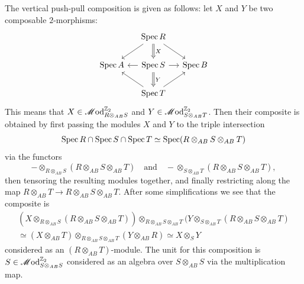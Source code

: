 The vertical push-pull composition is given as follows: let $X$ and $Y$ be two composable $2$-morphisms:
\begin{equation*}
	\begin{tikzcd}[column sep = small]
		& \Spec R \ar[d, "X", Rightarrow] \ar[dl] \ar[dr] & \\
		\Spec A & \Spec S \ar[d, "Y", Rightarrow] \ar[l] \ar[r] & \Spec B \\
		& \Spec T \ar[ul] \ar[ur] &
	\end{tikzcd}
\end{equation*}
This means that $X \in \mathscr{M}\mathrm{od}^{\mathbb{Z}_2}_{R \otimes_{AB} S}$ and $Y \in \mathscr{M}\mathrm{od}^{\mathbb{Z}_2}_{S \otimes_{AB} T}$. Then their composite is obtained by first passing the modules $X$ and $Y$ to the triple intersection
\begin{equation*}
	\operatorname{Spec} R \cap \operatorname{Spec} S \cap \operatorname{Spec} T \simeq \operatorname{Spec} (R \otimes_{AB} S \otimes_{AB} T)
\end{equation*}
via the functors
\begin{equation*}
	- \otimes_{R \otimes_{AB} S} (R \otimes_{AB} S \otimes_{AB} T) \quad \text{and} \quad - \otimes_{S \otimes_{AB} T} (R \otimes_{AB} S \otimes_{AB} T),
\end{equation*}
then tensoring the resulting modules together, and finally restricting along the map $R \otimes_{AB} T \to R \otimes_{AB} S \otimes_{AB} T$. After some simplifications we see that the composite is
\begin{multline*}
	(X \otimes_{R \otimes_{AB} S} (R \otimes_{AB} S \otimes_{AB} T)) \otimes_{R \otimes_{AB} S \otimes_{AB} T} (Y \otimes_{S \otimes_{AB} T} (R \otimes_{AB} S \otimes_{AB} T) \\
	\simeq (X \otimes_{{AB}} T) \otimes_{R \otimes_{AB} S \otimes_{AB} T} (Y \otimes_{AB} R) \simeq X \otimes_S Y
\end{multline*}
considered as an $(R \otimes_{AB} T)$-module. The unit for this composition is $S \in \mathscr{M}\mathrm{od}^{\mathbb{Z}_2}_{S \otimes_{{AB}} S}$ considered as an algebra over $S \otimes_{{AB}} S$ via the multiplication map.

